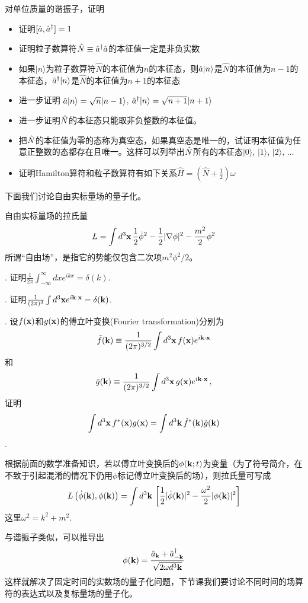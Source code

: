 \documentclass[CJK]{beamer}
\begin{document}
\begin{frame}
\bch
对单位质量的谐振子，证明
\begin{itemize}
\item{证明$[\hat{a}, {\hat{a}^\dagger}] = 1$}
\item{证明粒子数算符$\hat{N} \equiv {\hat{a}^\dagger} \hat{a}$的本征值一定是非负实数}
\item{如果$|n\rangle$为粒子数算符$\hat{N}$的本征值为$n$的本征态，则$\hat{a}|n\rangle$是$\hat{N}$的本征值为$n-1$的本征态，${\hat{a}^\dagger}|n\rangle$是$\hat{N}$的本征值为$n+1$的本征态}
\item{进一步证明 $\hat{a}|n\rangle = \sqrt{n}|n-1\rangle$, ${\hat{a}^\dagger}|n\rangle = \sqrt{n+1}|n+1\rangle$} 
\item{进一步证明$\hat{N}$的本征态只能取非负整数的本征值。}
\item{把$\hat{N}$的本征值为零的态称为真空态，如果真空态是唯一的，试证明本征值为任意正整数的态都存在且唯一。这样可以列举出$\hat{N}$所有的本征态$|0\rangle$, $|1\rangle$, $|2\rangle$, $\ldots$}
\item{证明Hamilton算符和粒子数算符有如下关系$\hat{H} = (\hat{N} + \frac{1}{2})\omega$}
\end{itemize}
\ech
\end{frame}

\begin{frame}
\bch
下面我们讨论自由实标量场的量子化。

\skipline
自由实标量场的拉氏量
$$L = \int d^3\mathbf{x} \, \frac{1}{2}\dot\phi^2 - \frac{1}{2}|\nabla \phi|^2 - \frac{m^2}{2}\phi^2$$
所谓“自由场”，是指它的势能仅包含二次项$m^2\phi^2/2$。

\ech
\end{frame}


\begin{frame}
. 证明$\frac{1}{2\pi}\int_{-\infty}^{\infty} dx e^{ikx} = \delta(k)$.

. 证明$\frac{1}{(2\pi)^3}\int d^3\mathbf{x} e^{i\mathbf{k}\cdot\mathbf{x}} = \delta(\mathbf{k})$.


. 设$f(\mathbf{x})$和$g(\mathbf{x})$的傅立叶变换(Fourier transformation)分别为
$$\tilde{f}(\mathbf{k}) \equiv \frac{1}{(2\pi)^{3/2}}\int d^3\mathbf{x}\, f(\mathbf{x})e^{i\mathbf{k}\cdot\mathbf{x}}$$和
$$\tilde{g}(\mathbf{k}) \equiv \frac{1}{(2\pi)^{3/2}}\int d^3\mathbf{x}\, g(\mathbf{x})e^{i\mathbf{k}\cdot\mathbf{x}}\,,$$
证明
$$\int d^3\mathbf{x}\,f^*(\mathbf{x})g(\mathbf{x}) = \int d^3\mathbf{k}\, \tilde{f}^*(\mathbf{k})\tilde{g}(\mathbf{k})$$.


\ech
\end{frame}

\begin{frame}
\bch
根据前面的数学准备知识，若以傅立叶变换后的$\phi(\mathbf{k};t)$为变量（为了符号简介，在不致于引起混淆的情况下仍用$\phi$标记傅立叶变换后的场），则拉氏量可写成
$$L\left(\dot\phi(\mathbf{k}), \phi(\mathbf{k})\right) = \int d^3\mathbf{k} \,\left[\frac{1}{2}|\dot\phi(\mathbf{k})|^2 - \frac{\omega^2}{2} |\phi(\mathbf{k})|^2\right]$$
这里$\omega^2 = k^2 + m^2$.

\skipline
与谐振子类似，可以推导出
$$\phi(\mathbf{k}) = \frac{\hat{a}_{\mathbf{k}}+{\hat{a}^\dagger}_{-\mathbf{k}}}{\sqrt{2\omega d^3\mathbf{k}}}$$
这样就解决了固定时间的实数场的量子化问题，下节课我们要讨论不同时间的场算符的表达式以及复标量场的量子化。
\ech
\end{frame}
\end{document}
